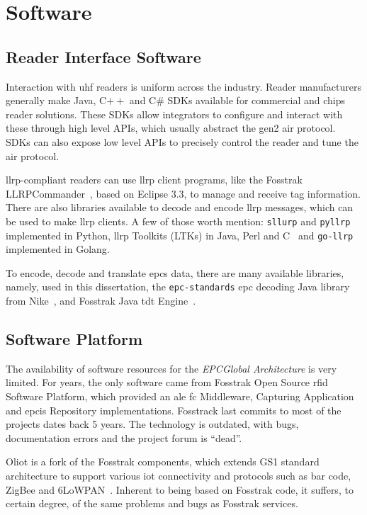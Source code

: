 \section{Software}

\subsection{Reader Interface Software}

Interaction with \ac{uhf} readers is uniform across the industry.
Reader manufacturers generally make Java, C$++$ and C\# SDKs available for commercial and chips reader solutions. These SDKs allow integrators to configure and interact with these through high level APIs, which usually abstract the \ac{gen2} air protocol. SDKs can also expose low level APIs to precisely control the reader and tune the air protocol.

\ac{llrp}-compliant readers can use \ac{llrp} client programs, like the Fosstrak LLRPCommander~\cite{FosstrakLLRPCommander}, based on Eclipse 3.3, to manage and receive tag information. 
There are also libraries available to decode and encode \ac{llrp} messages, which can be used to make \ac{llrp} clients. A few of those worth mention: \texttt{sllurp} and \texttt{pyllrp} implemented in Python, \ac{llrp} Toolkits (LTKs) in Java, Perl and C\+\+~\cite{LlrpOrga} and \texttt{go-llrp} implemented in Golang.

To encode, decode and translate \acp{epc} data, there are many available libraries, namely, used in this dissertation, the \texttt{epc-standards} \ac{epc} decoding Java library from Nike~\cite{NikeIncEpcstandards2019}, and Fosstrak Java \ac{tdt} Engine~\cite{FosstrakTagData}.

\subsection{Software Platform} \label{sec:softwareplatformoptions}

The availability of software resources for the \emph{EPCGlobal Architecture} is very limited.
For years, the only software came from Fosstrak Open Source \ac{rfid} Software Platform, which provided an \ac{ale} \ac{fc} Middleware, Capturing Application and \ac{epcis} Repository implementations. Fosstrack last commits to most of the projects dates back 5 years. The technology is outdated, with bugs, documentation errors and the project forum is ``dead''.

Oliot is a fork of the Fosstrak components, which extends GS1 standard architecture to support various \ac{iot} connectivity and protocols such as bar code, ZigBee and 6LoWPAN~\cite{OpenLanguageInternet}. Inherent to being based on Fosstrak code, it suffers, to certain degree, of the same problems and bugs as Fosstrak services.


